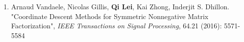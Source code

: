 \documentclass[margin, 10pt]{res} %
\begin{document}
\begin{resume}
\begin{enumerate}
	\item {Arnaud Vandaele, Nicolas Gillis, \textbf{Qi Lei},
      Kai Zhong, Inderjit S. Dhillon. "Coordinate Descent Methods for
		Symmetric Nonnegative Matrix Factorization", \textit{IEEE Transactions on 
Signal Processing}, 64.21 (2016): 5571-5584}	
\end{enumerate}

\begin{comment}
\section{SOFTWARE}
 \textit{Github: }\url{https://github.com/cecilialeiqi/}\\
 {\sl SPIRAL} \hfill May 2016 - July 2017
 \begin{itemize}
   \item Feature representation learning of any time series data
    \end{itemize}
 {\sl DDI} \hfill Jan 2017 - May 2017
 \begin{itemize}
   \item Use an inductive tensor completion based methods to predict drug-drug interactions
   \end{itemize}
   {\sl NUTF} \hfill August 2016 - February 2017
   \begin{itemize}
     \item Negative-Unlabeled Tensor Factorization for Location\ Context 
       Inference from Inaccurate Mobility Data
      \end{itemize}
 \end{itemize} 
\end{comment} 

\end{resume}
\end{document}
